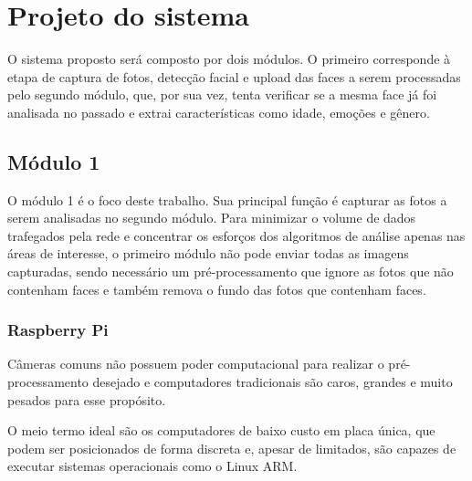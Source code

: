 \chapter{Projeto do sistema}\label{cap:projeto}

O sistema proposto será composto por dois módulos.
O primeiro corresponde à etapa de captura de fotos, detecção facial e upload das faces a serem processadas pelo segundo módulo, que, por sua vez, tenta verificar se a mesma face já foi analisada no passado e extrai características como idade, emoções e gênero.

\section{Módulo 1}\label{sec:modulo1}

O módulo 1 é o foco deste trabalho. Sua principal função é capturar as fotos a serem analisadas no segundo módulo.
Para minimizar o volume de dados trafegados pela rede e concentrar os esforços dos algoritmos de análise apenas nas áreas de interesse, o primeiro módulo não pode enviar todas as imagens capturadas, sendo necessário um pré-processamento que ignore as fotos que não contenham faces e também remova o fundo das fotos que contenham faces.

\subsection{Raspberry Pi}

Câmeras comuns não possuem poder computacional para realizar o pré-processamento desejado e computadores tradicionais são caros, grandes e muito pesados para esse propósito.

O meio termo ideal são os computadores de baixo custo em placa única, que podem ser posicionados de forma discreta e, apesar de limitados, são capazes de executar sistemas operacionais como o Linux ARM.

